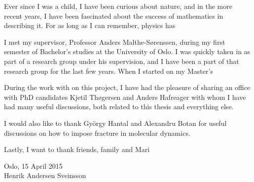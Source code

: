\begin{acknowledgements}
Ever since I was a child, I have been curious about nature, and in the more recent years, I have been fascinated about the success of mathematics in describing it. For as long as I can remember, physics has 

I met my supervisor, Professor Anders Malthe-Sørenssen, during my first semester of Bachelor's studies at the University of Oslo. I was quickly taken in as part of a research group under his supervision, and I have been a part of that research group for the last few years. When I started on my Master's 

During the work with on this project, I have had the pleasure of sharing an office with PhD candidates Kjetil Thøgersen and Anders Hafreager with whom I have had many useful discussions, both related to this thesis and everything else. 

I would also like to thank Gy\"orgy Hantal and Alexandru Botan for useful discussions on how to impose  fracture in molecular dynamics.

Lastly, I want to thank friends, family and Mari

\begin{flushright}
Oslo, 15 April 2015 \\
Henrik Andersen Sveinsson
\end{flushright}
\end{acknowledgements}
